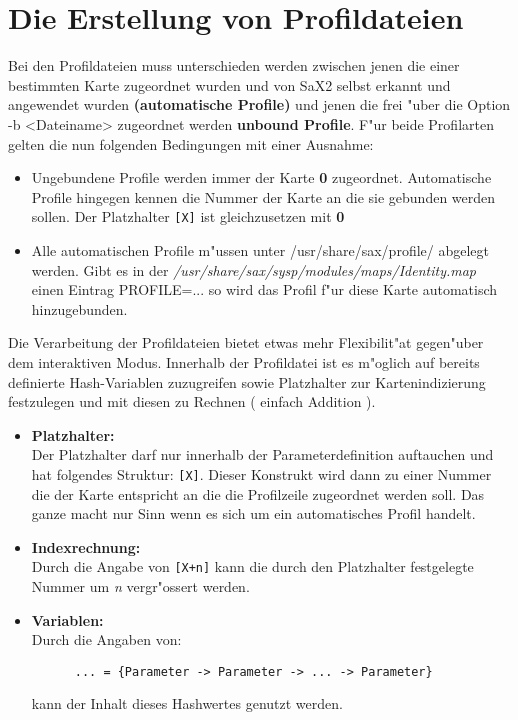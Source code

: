 \section{Die Erstellung von Profildateien}
Bei den Profildateien muss unterschieden werden zwischen jenen 
die einer bestimmten Karte zugeordnet wurden und von SaX2 selbst 
erkannt und angewendet wurden \textbf{(automatische Profile)} und jenen 
die frei "uber die Option -b <Dateiname> zugeordnet werden 
\textbf{unbound Profile}. F"ur beide Profilarten gelten die nun 
folgenden Bedingungen mit einer Ausnahme:
\begin{itemize}
\item Ungebundene Profile werden immer der Karte \textbf{0} zugeordnet.
      Automatische Profile hingegen kennen die Nummer der Karte an die
      sie gebunden werden sollen. Der Platzhalter \verb+[X]+ ist 
      gleichzusetzen mit \textbf{0}
\item Alle automatischen Profile m"ussen unter /usr/share/sax/profile/ 
      abgelegt werden. Gibt es in der 
      \textit{/usr/share/sax/sysp/modules/maps/Identity.map} einen 
      Eintrag PROFILE=... so wird das Profil f"ur diese Karte 
      automatisch hinzugebunden.
\end{itemize} 

Die Verarbeitung der Profildateien bietet etwas mehr Flexibilit"at 
gegen"uber dem interaktiven Modus. Innerhalb der Profildatei ist
es m"oglich auf bereits definierte Hash-Variablen zuzugreifen sowie
Platzhalter zur Kartenindizierung festzulegen und mit diesen zu 
Rechnen ( einfach Addition ).
\begin{itemize}
\item \textbf{Platzhalter:}\\
      Der Platzhalter darf nur innerhalb der Parameterdefinition 
      auftauchen und hat folgendes Struktur: \verb+[X]+. Dieser
      Konstrukt wird dann zu einer Nummer die der Karte entspricht 
      an die die Profilzeile zugeordnet werden soll. Das ganze
      macht nur Sinn wenn es sich um ein automatisches Profil handelt.
\item \textbf{Indexrechnung:}\\
      Durch die Angabe von \verb=[X+n]= kann
      die durch den Platzhalter festgelegte Nummer um \textit{n}
      vergr"ossert werden.
\item \textbf{Variablen:}\\
      Durch die Angaben von:
      \begin{verbatim}
      ... = {Parameter -> Parameter -> ... -> Parameter}
      \end{verbatim}
      kann der Inhalt dieses Hashwertes genutzt werden. 
\end{itemize}

